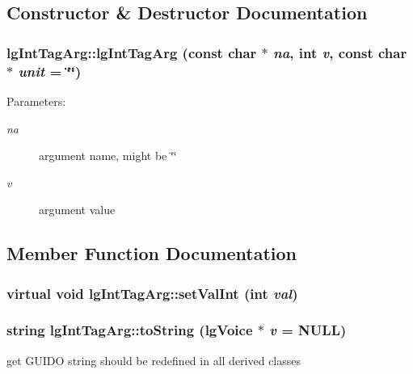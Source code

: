 \subsection{Constructor \& Destructor Documentation}
\subsubsection{\setlength{\rightskip}{0pt plus 5cm}lg\-Int\-Tag\-Arg::lg\-Int\-Tag\-Arg (const char $\ast$ {\em na}, int {\em v}, const char $\ast$ {\em unit} = \char`\"{}\char`\"{})}\label{classlgIntTagArg_a1}


\begin{Desc}
\item[Parameters: ]\par
\begin{description}
\item[{\em 
na}]argument name, might be \char`\"{}\char`\"{} \item[{\em 
v}]argument value \end{description}
\end{Desc}


\subsection{Member Function Documentation}
\subsubsection{\setlength{\rightskip}{0pt plus 5cm}virtual void lg\-Int\-Tag\-Arg::set\-Val\-Int (int {\em val})\hspace{0.3cm}{\tt  [inline, virtual]}}\label{classlgIntTagArg_a5}


\subsubsection{\setlength{\rightskip}{0pt plus 5cm}string lg\-Int\-Tag\-Arg::to\-String ({\bf lg\-Voice} $\ast$ {\em v} = NULL)\hspace{0.3cm}{\tt  [virtual]}}\label{classlgIntTagArg_a0}


get GUIDO string should be redefined in all derived classes 

